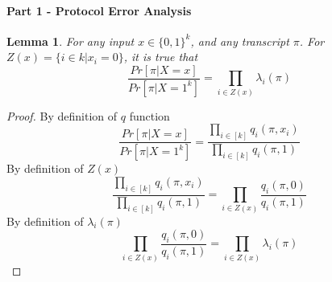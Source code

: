 \documentclass{article}
\theoremstyle{plain}
\newtheorem{lemma}[theorem]{Lemma}
\begin{document}
\paragraph{Part 1 - Protocol Error Analysis}
\begin{lemma}
For any input $x \in \{0,1\}^k$, and any transcript $\pi$. For $Z(x) = \{i \in k | x_i = 0\}$, it is true that  \newline
\begin{equation*}
    \frac{Pr[\pi | X = x]}{Pr[\pi | X = 1^k]} = \prod_{i \in Z(x)} \lambda_i(\pi)
\end{equation*}
\end{lemma}
\begin{proof}
By definition of $q$ function
\begin{equation*}
    \frac{Pr[\pi | X = x]}{Pr[\pi | X = 1^k]} = \frac{\prod_{i \in [k]} q_i (\pi, x_i)}{\prod_{i \in [k]} q_i (\pi, 1)}
\end{equation*}
By definition of $Z(x)$
\begin{equation*}
    \frac{\prod_{i \in [k]} q_i (\pi, x_i)}{\prod_{i \in [k]} q_i (\pi, 1)} = \prod_{i \in Z(x)} \frac{q_i (\pi, 0)}{q_i (\pi, 1)}
\end{equation*}
By definition of $\lambda_i (\pi)$
\begin{equation*}
    \prod_{i \in Z(x)} \frac{q_i (\pi, 0)}{q_i (\pi, 1)} = \prod_{i \in Z(x)} \lambda_i (\pi)
\end{equation*}
\end{proof}
\end{document}
